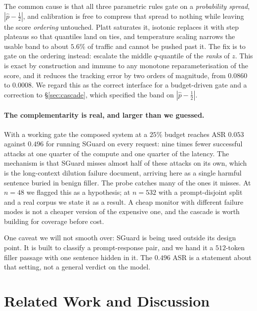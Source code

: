 \documentclass[10pt]{article}
\theoremstyle{plain}
\theoremstyle{definition}
\theoremstyle{remark}
\begin{document}
The common cause is that all three parametric rules gate on a \emph{probability spread},
$|\hat p-\frac12|$, and calibration is free to compress that spread to nothing while
leaving the score \emph{ordering} untouched. Platt saturates it, isotonic replaces it with
step plateaus so that quantiles land on ties, and temperature scaling narrows the usable
band to about $5.6\%$ of traffic and cannot be pushed past it. The fix is to gate on the
ordering instead: escalate the middle $q$-quantile of the \emph{ranks} of $z$. This is
exact by construction and immune to any monotone reparameterisation of the score, and it
reduces the tracking error by two orders of magnitude, from $0.0860$ to $0.0008$. We
regard this as the correct interface for a budget-driven gate and a correction to
\S\ref{sec:cascade}, which specified the band on $|\hat p-\frac12|$.

\paragraph{The complementarity is real, and larger than we guessed.} With a working gate
the composed system at a $25\%$ budget reaches ASR $0.053$ against $0.496$ for running
SGuard on every request: nine times fewer successful attacks at one quarter of the
compute and one quarter of the latency. The mechanism is that SGuard misses almost half of
these attacks on its own, which is the long-context dilution failure
\citet{chen2026longguard} document, arriving here as a single harmful sentence buried in
benign filler. The probe catches many of the ones it misses. At $n{=}48$ we flagged this
as a hypothesis; at $n{=}532$ with a prompt-disjoint split and a real corpus we state it as
a result. A cheap monitor with different failure modes is not a cheaper version of the
expensive one, and the cascade is worth building for coverage before cost.

One caveat we will not smooth over: SGuard is being used outside its design point. It is
built to classify a prompt-response pair, and we hand it a $512$-token filler passage with
one sentence hidden in it. The $0.496$ ASR is a statement about that setting, not a general
verdict on the model.

\section{Related Work and Discussion}
\label{sec:related}
\end{document}
